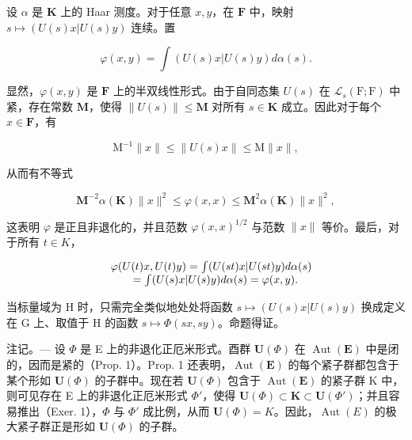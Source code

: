 设 \(\alpha\) 是 \(\mathbf{K}\) 上的 Haar 测度。对于任意 \(x, y\)，在 \(\mathbf{F}\) 中，映射 \(s \mapsto (U(s)x|U(s)y)\) 连续。置

\[
\varphi (x, y) = \int (U (s) x | U (s) y) d \alpha (s).
\]

显然，\(\varphi(x,y)\) 是 \(\mathbf{F}\) 上的半双线性形式。由于自同态集 \(U(s)\) 在 \(\mathcal{L}_s(\mathrm{F};\mathrm{F})\) 中紧，存在常数 \(\mathbf{M}\)，使得 \(\| U(s)\| \leqslant \mathbf{M}\) 对所有 \(s\in \mathbf{K}\) 成立。因此对于每个 \(x\in \mathbf{F}\)，有

\[
\mathrm{M} ^ {- 1} \| x \| \leqslant \| U (s) x \| \leqslant \mathrm{M} \| x \|,
\]

从而有不等式

\[
\mathbf {M} ^ {- 2} \alpha (\mathbf {K}) \| x \| ^ {2} \leqslant \varphi (x, x) \leqslant \mathbf {M} ^ {2} \alpha (\mathbf {K}) \| x \| ^ {2},
\]

这表明 \(\varphi\) 是正且非退化的，并且范数 \(\varphi(x,x)^{1/2}\) 与范数 \(\|x\|\) 等价。最后，对于所有 \(t \in K\)，

\[
\begin{array}{r l} & {\varphi (U (t) x, U (t) y) = \int (U (s t) x | U (s t) y) d \alpha (s)} \\ & {\qquad = \int (U (s) x | U (s) y) d \alpha (s) = \varphi (x, y).} \end{array}
\]

当标量域为 H 时，只需完全类似地处处将函数 \(s \mapsto (U(s)x|U(s)y)\) 换成定义在 G 上、取值于 H 的函数 \(s \mapsto \Phi(sx, sy)\)。命题得证。

注记。--- 设 \(\Phi\) 是 E 上的非退化正厄米形式。酉群 \(\mathbf{U}(\Phi)\) 在 \(\operatorname{Aut}(\mathbf{E})\) 中是闭的，因而是紧的（Prop. 1）。Prop. 1 还表明，\(\operatorname{Aut}(\mathbf{E})\) 的每个紧子群都包含于某个形如 \(\mathbf{U}(\Phi)\) 的子群中。现在若 \(\mathbf{U}(\Phi)\) 包含于 \(\operatorname{Aut}(\mathbf{E})\) 的紧子群 K 中，则可见存在 E 上的非退化正厄米形式 \(\Phi'\)，使得 \(\mathbf{U}(\Phi) \subset \mathbf{K} \subset \mathbf{U}(\Phi')\)；并且容易推出（Exer. 1），\(\Phi\) 与 \(\Phi'\) 成比例，从而 \(\mathbf{U}(\Phi) = K\)。因此，\(\operatorname{Aut}(E)\) 的极大紧子群正是形如 \(\mathbf{U}(\Phi)\) 的子群。


